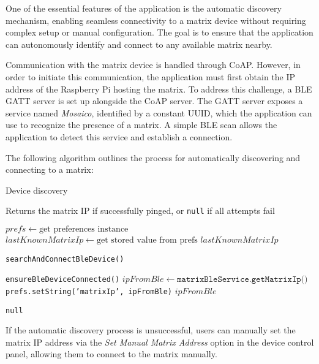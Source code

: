 One of the essential features of the application is the automatic discovery mechanism, enabling seamless connectivity to a matrix device without requiring complex setup or manual configuration. The goal is to ensure that the application can autonomously identify and connect to any available matrix nearby.

Communication with the matrix device is handled through CoAP. However, in order to initiate this communication, the application must first obtain the IP address of the Raspberry Pi hosting the matrix. To address this challenge, a BLE GATT server is set up alongside the CoAP server. The GATT server exposes a service named \textit{Mosaico}, identified by a constant UUID, which the application can use to recognize the presence of a matrix. A simple BLE scan allows the application to detect this service and establish a connection.

The following algorithm outlines the process for automatically discovering and connecting to a matrix:

\begin{algorithm} \caption{Device discovery}\label{alg
} \begin{algorithmic} \Ensure Returns the matrix IP if successfully pinged, or \texttt{null} if all attempts fail

\State $prefs \gets \text{get preferences instance}$ \State $lastKnownMatrixIp \gets \text{get stored value from prefs}$  \State \Return $lastKnownMatrixIp$ \EndIf

 \State \texttt{searchAndConnectBleDevice()}  \EndIf

\State \texttt{ensureBleDeviceConnected()} \State $ipFromBle \gets \texttt{matrixBleService.getMatrixIp()}$  \State \texttt{prefs.setString('matrixIp', ipFromBle)} \State \Return $ipFromBle$ \EndIf

\State \Return \texttt{null} \end{algorithmic} \end{algorithm}

If the automatic discovery process is unsuccessful, users can manually set the matrix IP address via the \textit{Set Manual Matrix Address} option in the device control panel, allowing them to connect to the matrix manually.